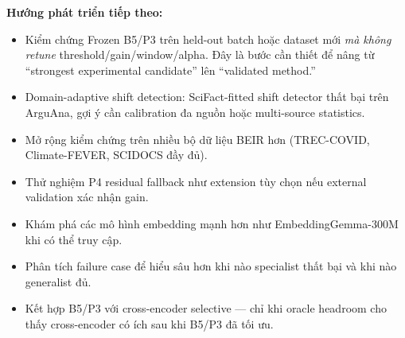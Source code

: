 \textbf{Hướng phát triển tiếp theo:}
\begin{itemize}[leftmargin=1.6em,itemsep=2pt]
  \item Kiểm chứng Frozen B5/P3 trên held-out batch hoặc dataset mới \emph{mà không retune}
  threshold/gain/window/alpha. Đây là bước cần thiết để nâng từ ``strongest experimental candidate''
  lên ``validated method.''
  \item Domain-adaptive shift detection: SciFact-fitted shift detector thất bại trên ArguAna, gợi ý cần
  calibration đa nguồn hoặc multi-source statistics.
  \item Mở rộng kiểm chứng trên nhiều bộ dữ liệu BEIR hơn (TREC-COVID, Climate-FEVER, SCIDOCS đầy đủ).
  \item Thử nghiệm P4 residual fallback như extension tùy chọn nếu external validation xác nhận gain.
  \item Khám phá các mô hình embedding mạnh hơn như EmbeddingGemma-300M khi có thể truy cập.
  \item Phân tích failure case để hiểu sâu hơn khi nào specialist thất bại và khi nào generalist đủ.
  \item Kết hợp B5/P3 với cross-encoder selective --- chỉ khi oracle headroom cho thấy cross-encoder có
  ích sau khi B5/P3 đã tối ưu.
\end{itemize}
